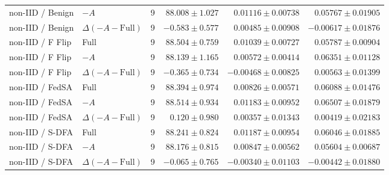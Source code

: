 \begin{table}[t]
\begin{tabular}{llrrrr}
non-IID / Benign & $-A$ & 9 & $88.008 \pm 1.027$ & $0.01116 \pm 0.00738$ & $0.05767 \pm 0.01905$ \\
non-IID / Benign & $\Delta(-A-\mathrm{Full})$ & 9 & $-0.583 \pm 0.577$ & $0.00485 \pm 0.00908$ & $-0.00617 \pm 0.01876$ \\
non-IID / F Flip & Full & 9 & $88.504 \pm 0.759$ & $0.01039 \pm 0.00727$ & $0.05787 \pm 0.00904$ \\
non-IID / F Flip & $-A$ & 9 & $88.139 \pm 1.165$ & $0.00572 \pm 0.00414$ & $0.06351 \pm 0.01128$ \\
non-IID / F Flip & $\Delta(-A-\mathrm{Full})$ & 9 & $-0.365 \pm 0.734$ & $-0.00468 \pm 0.00825$ & $0.00563 \pm 0.01399$ \\
non-IID / FedSA & Full & 9 & $88.394 \pm 0.974$ & $0.00826 \pm 0.00571$ & $0.06088 \pm 0.01476$ \\
non-IID / FedSA & $-A$ & 9 & $88.514 \pm 0.934$ & $0.01183 \pm 0.00952$ & $0.06507 \pm 0.01879$ \\
non-IID / FedSA & $\Delta(-A-\mathrm{Full})$ & 9 & $0.120 \pm 0.980$ & $0.00357 \pm 0.01343$ & $0.00419 \pm 0.02183$ \\
non-IID / S-DFA & Full & 9 & $88.241 \pm 0.824$ & $0.01187 \pm 0.00954$ & $0.06046 \pm 0.01885$ \\
non-IID / S-DFA & $-A$ & 9 & $88.176 \pm 0.815$ & $0.00847 \pm 0.00562$ & $0.05604 \pm 0.00687$ \\
non-IID / S-DFA & $\Delta(-A-\mathrm{Full})$ & 9 & $-0.065 \pm 0.765$ & $-0.00340 \pm 0.01103$ & $-0.00442 \pm 0.01880$ \\
\bottomrule
\end{tabular}
\end{table}

